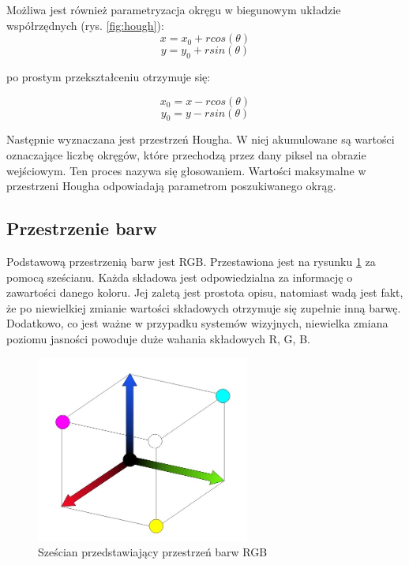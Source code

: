 Możliwa jest również parametryzacja okręgu w biegunowym układzie współrzędnych (rys. \ref{fig:hough}):
\begin{equation}
x = x_0 + rcos(\theta)
\end{equation}
\begin{equation}
y = y_0 + rsin(\theta)
\end{equation}

po prostym przekształceniu otrzymuje się:

\begin{equation}
x_0 = x - rcos(\theta)
\end{equation}
\begin{equation}
y_0 = y - rsin(\theta)
\end{equation}

Następnie wyznaczana jest przestrzeń Hougha. 
W niej akumulowane są wartości oznaczające liczbę okręgów, które przechodzą przez dany piksel na obrazie wejściowym.
Ten proces nazywa się głosowaniem. 
Wartości maksymalne w przestrzeni Hougha odpowiadają parametrom poszukiwanego okrąg.


\subsection{Przestrzenie barw}

Podstawową przestrzenią barw jest RGB. 
Przestawiona jest na rysunku \ref{fig:rgb} za pomocą sześcianu. 
Każda składowa jest odpowiedzialna za informację o zawartości danego koloru. 
Jej zaletą jest prostota opisu, natomiast wadą jest fakt, że po niewielkiej zmianie wartości składowych otrzymuje się zupełnie inną barwę. 
Dodatkowo, co jest ważne w przypadku systemów wizyjnych, niewielka zmiana poziomu jasności powoduje duże wahania składowych R, G, B.

\begin{figure}
  \centering
  \includegraphics[width=7cm]{img/rgb.jpg}
  \caption{Sześcian przedstawiający przestrzeń barw RGB\cite{W4}}
  \label{fig:rgb}
\end{figure}


